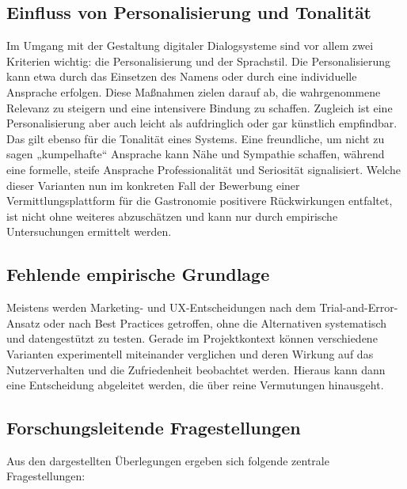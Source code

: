 \subsection{Einfluss von Personalisierung und Tonalität}

Im Umgang mit der Gestaltung digitaler Dialogsysteme sind vor allem zwei Kriterien wichtig: die
Personalisierung und der Sprachstil. Die Personalisierung kann etwa durch das Einsetzen des Namens
oder durch eine individuelle Ansprache erfolgen. Diese Maßnahmen zielen darauf ab, die wahrgenommene
Relevanz zu steigern und eine intensivere Bindung zu schaffen.
Zugleich ist eine Personalisierung aber auch leicht als aufdringlich oder gar künstlich
empfindbar. Das gilt ebenso für die Tonalität eines Systems. Eine freundliche, um nicht zu sagen
„kumpelhafte“ Ansprache kann Nähe und Sympathie schaffen, während eine formelle, steife
Ansprache Professionalität und Seriosität signalisiert.
Welche dieser Varianten nun im konkreten Fall der Bewerbung einer Vermittlungsplattform für die
Gastronomie positivere Rückwirkungen entfaltet, ist nicht ohne weiteres abzuschätzen und kann nur
durch empirische Untersuchungen ermittelt werden.

\subsection{Fehlende empirische Grundlage}

Meistens werden Marketing- und UX-Entscheidungen nach dem Trial-and-Error-Ansatz oder
nach Best Practices getroffen, ohne die Alternativen systematisch und datengestützt zu
testen. Gerade im Projektkontext können verschiedene Varianten experimentell miteinander
verglichen und deren Wirkung auf das Nutzerverhalten und die Zufriedenheit beobachtet
werden. Hieraus kann dann eine Entscheidung abgeleitet werden, die über reine Vermutungen
hinausgeht.

\subsection{Forschungsleitende Fragestellungen}

Aus den dargestellten Überlegungen ergeben sich folgende
zentrale Fragestellungen:

